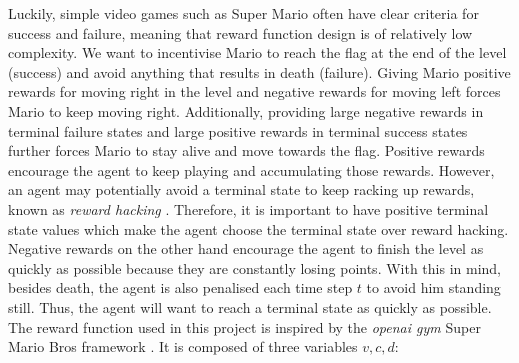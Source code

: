 \documentclass[notitlepage,a4paper,11pt]{article}
\begin{document}
Luckily, simple video games such as Super Mario often have clear criteria for success and failure, meaning that reward function design is of relatively low complexity. We want to incentivise Mario to reach the flag at the end of the level (success) and avoid anything that results in death (failure). Giving Mario positive rewards for moving right in the level and negative rewards for moving left forces Mario to keep moving right. Additionally, providing large negative rewards in terminal failure states and large positive rewards in terminal success states further forces Mario to stay alive and move towards the flag. Positive rewards encourage the agent to keep playing and accumulating those rewards. However, an agent may potentially avoid a terminal state to keep racking up rewards, known as \textit{reward hacking} \cite{amodei2016concrete}. Therefore, it is important to have positive terminal state values which make the agent choose the terminal state over reward hacking. Negative rewards on the other hand encourage the agent to finish the level as quickly as possible because they are constantly losing points. With this in mind, besides death, the agent is also penalised each time step $t$ to avoid him standing still. Thus, the agent will want to reach a terminal state as quickly as possible.
\linebreak
The reward function used in this project is inspired by the  \textit{openai gym} Super Mario Bros framework \cite{pypi}. It is composed of three variables $v, c, d$:
\end{document}
